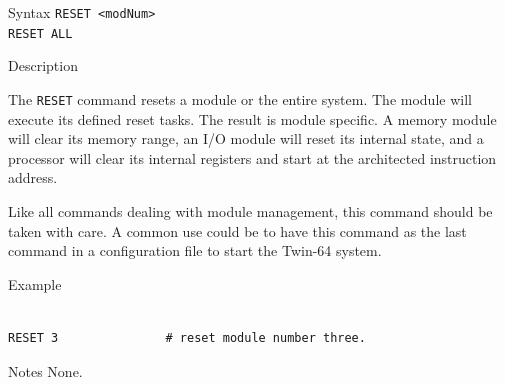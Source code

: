 %
%
\pagebreak
{}

\begin{iPageDescEntry}{Syntax}
\texttt{RESET <modNum> } \\
\texttt{RESET ALL } \\
\end{iPageDescEntry}

\begin{iPageDescEntry}{Description}

The \texttt{RESET} command resets a module or the entire system. The module will execute its defined reset tasks. The result is module specific. A memory module will clear its memory range, an I/O module will reset its internal state, and a processor will clear its internal registers and start at the architected instruction address.

Like all commands dealing with module management, this command should be taken with care. A common use could be to have this command as the last command in a configuration file to start the Twin-64 system.

\end{iPageDescEntry}

\begin{iPageDescOpEntry}{Example}
\begin{lstlisting}[style=iPageOpStyle]

RESET 3               # reset module number three.

\end{lstlisting}
\end{iPageDescOpEntry}

\begin{iPageDescEntry}{Notes}
None.
\end{iPageDescEntry}
